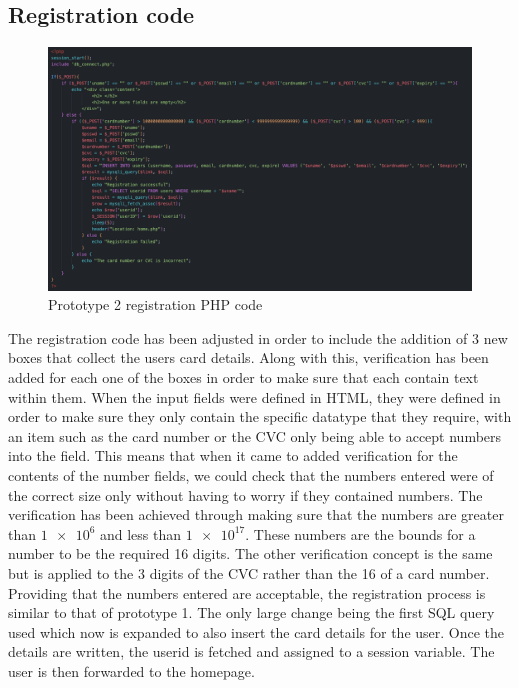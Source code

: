 \subsection{Registration code}
\begin{figure}[H]
    \centering
    \includegraphics[scale=0.3]{ch3_developing/proto2/proto2_register.png}
    \caption{Prototype 2 registration PHP code}
    \label{fig:proto2_register}
\end{figure}
The registration code has been adjusted in order to include the addition of 3 new boxes that collect the users card details. Along with this, verification has been added for each one of the boxes in order to make sure that each contain text within them. When the input fields were defined in HTML, they were defined in order to make sure they only contain the specific datatype that they require, with an item such as the card number or the CVC only being able to accept numbers into the field. This means that when it came to added verification for the contents of the number fields, we could check that the numbers entered were of the correct size only without having to worry if they contained numbers. The verification has been achieved through making sure that the numbers are greater than $\num{1e6}$ and less than $\num{1e17}$. These numbers are the bounds for a number to be the required 16 digits. The other verification concept is the same but is applied to the 3 digits of the CVC rather than the 16 of a card number. Providing that the numbers entered are acceptable, the registration process is similar to that of prototype 1. The only large change being the first SQL query used which now is expanded to also insert the card details for the user. Once the details are written, the userid is fetched and assigned to a session variable. The user is then forwarded to the homepage. 

